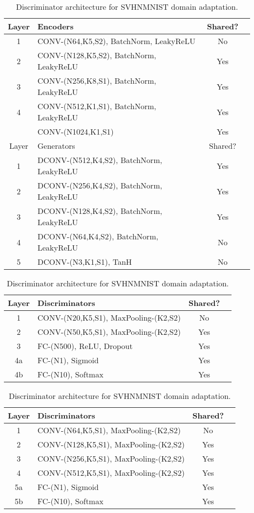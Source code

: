 \documentclass{article}
\begin{document}
\begin{table}[tbh!]
\caption{\small Encoder and generator architecture for MNISTUSPS domain adaptation.}
\label{tbl::digit_vae}
\small
\centering
\begin{tabularx}{265pt}{clcc}
\toprule
Layer &  Encoders & Shared? \tabularnewline\midrule
1 & CONV-(N64,K5,S2), BatchNorm, LeakyReLU &No\tabularnewline
2 & CONV-(N128,K5,S2), BatchNorm, LeakyReLU  &Yes\tabularnewline
3 & CONV-(N256,K8,S1), BatchNorm, LeakyReLU  &Yes\tabularnewline
4 & CONV-(N512,K1,S1), BatchNorm, LeakyReLU  &Yes\tabularnewline
 & CONV-(N1024,K1,S1) &Yes\tabularnewline\midrule
Layer &  Generators & Shared?\tabularnewline\midrule
1 &  DCONV-(N512,K4,S2), BatchNorm, LeakyReLU & Yes\tabularnewline
2 &  DCONV-(N256,K4,S2), BatchNorm, LeakyReLU &Yes\tabularnewline
3 &  DCONV-(N128,K4,S2), BatchNorm, LeakyReLU &Yes\tabularnewline
4 &  DCONV-(N64,K4,S2), BatchNorm, LeakyReLU &No\tabularnewline
5 &  DCONV-(N3,K1,S1), TanH & No\tabularnewline\midrule
\end{tabularx}
\caption{\small Discriminator architecture for MNISTUSPS domain adaptation.}
\label{tbl::digit_lenet}
\small
\centering
\begin{tabularx}{265pt}{clcc}
\toprule
Layer &  Discriminators & Shared? \tabularnewline\midrule
1 & CONV-(N20,K5,S1), MaxPooling-(K2,S2) &No\tabularnewline
2 & CONV-(N50,K5,S1), MaxPooling-(K2,S2) &Yes\tabularnewline
3 & FC-(N500), ReLU, Dropout  &Yes\tabularnewline
4a & FC-(N1), Sigmoid  &Yes\tabularnewline
4b & FC-(N10), Softmax  &Yes\tabularnewline\bottomrule
\end{tabularx}
\caption{\small Discriminator architecture for SVHNMNIST domain adaptation.}
\label{tbl::arch_maxpool_svhn}
\small
\centering
\begin{tabularx}{265pt}{clcc}
\toprule
Layer &  Discriminators & Shared? \tabularnewline\midrule
1 & CONV-(N64,K5,S1), MaxPooling-(K2,S2) &No\tabularnewline
2 & CONV-(N128,K5,S1), MaxPooling-(K2,S2) &Yes\tabularnewline
3 & CONV-(N256,K5,S1), MaxPooling-(K2,S2) &Yes\tabularnewline
4 & CONV-(N512,K5,S1), MaxPooling-(K2,S2) &Yes\tabularnewline
5a & FC-(N1), Sigmoid  &Yes\tabularnewline
5b & FC-(N10), Softmax  &Yes\tabularnewline\bottomrule
\end{tabularx}
\end{table}


 
\end{document}
